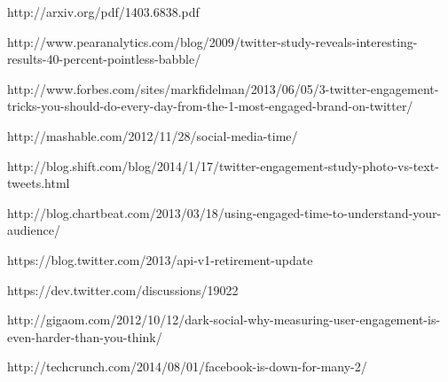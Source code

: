 \begin{thebibliography}{9}
http://arxiv.org/pdf/1403.6838.pdf

http://www.pearanalytics.com/blog/2009/twitter-study-reveals-interesting-results-40-percent-pointless-babble/

http://www.forbes.com/sites/markfidelman/2013/06/05/3-twitter-engagement-tricks-you-should-do-every-day-from-the-1-most-engaged-brand-on-twitter/

http://mashable.com/2012/11/28/social-media-time/

http://blog.shift.com/blog/2014/1/17/twitter-engagement-study-photo-vs-text-tweets.html

http://blog.chartbeat.com/2013/03/18/using-engaged-time-to-understand-your-audience/

https://blog.twitter.com/2013/api-v1-retirement-update

https://dev.twitter.com/discussions/19022

http://gigaom.com/2012/10/12/dark-social-why-measuring-user-engagement-is-even-harder-than-you-think/


http://techcrunch.com/2014/08/01/facebook-is-down-for-many-2/
  
\end{thebibliography}


